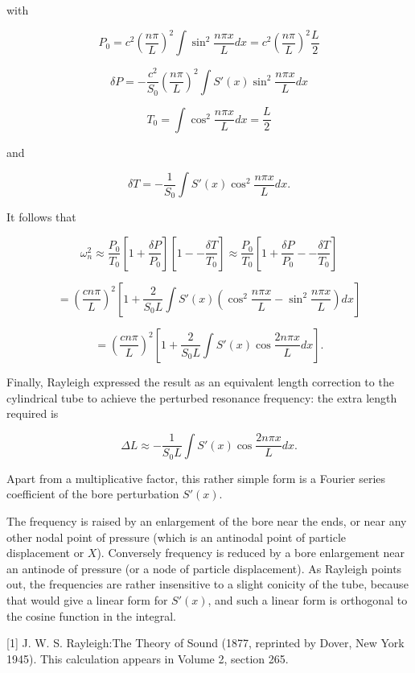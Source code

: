   with 

  $$P_0=c^2 \left(\dfrac{n \pi}{L}\right)^2 \int{ \sin^2 \dfrac{n \pi x}{L} 
  dx}=c^2 \left(\dfrac{n \pi}{L}\right)^2 \dfrac{L}{2} \tag{14}$$ 

  $$\delta P=-\dfrac{c^2}{S_0} \left(\dfrac{n \pi}{L}\right)^2 \int{S'(x) 
  \sin^2 \dfrac{n \pi x}{L} dx} \tag{15}$$ 

  $$T_0=\int{ \cos^2 \dfrac{n \pi x}{L} dx} =\dfrac{L}{2} \tag{16}$$ 

  and 

  $$\delta T=-\dfrac{1}{S_0} \int{S'(x) \cos^2 \dfrac{n \pi x}{L} dx} . 
  \tag{17}$$ 

  It follows that 

  $$\omega_n^2 \approx \dfrac{P_0}{T_0}\left[1 + \dfrac{\delta P}{P_0}\right] 
  \left[1 -- \dfrac{\delta T}{T_0}\right]\approx \dfrac{P_0}{T_0}\left[1 + 
  \dfrac{\delta P}{P_0} -- \dfrac{\delta T}{T_0}\right]$$ 

  $$=\left(\dfrac{c n \pi}{L}\right)^2 \left[1+\dfrac{2}{S_0L} \int{S'(x) 
  \left(\cos^2\dfrac{n \pi x}{L}-\sin^2 \dfrac{n \pi x}{L} \right) dx}\right]$$ 

  $$=\left(\dfrac{c n \pi}{L}\right)^2 \left[1+\dfrac{2}{S_0L} \int{S'(x) 
  \cos\dfrac{2n \pi x}{L} dx}\right] . \tag{18}$$ 

  Finally, Rayleigh expressed the result as an equivalent length correction to 
  the cylindrical tube to achieve the perturbed resonance frequency: the extra 
  length required is 

  $$\Delta L \approx -\dfrac{1}{S_0L} \int{S'(x) \cos\dfrac{2n \pi x}{L} dx} . 
  \tag{19}$$ 

  Apart from a multiplicative factor, this rather simple form is a Fourier 
  series coefficient of the bore perturbation $S'(x)$. 

  The frequency is raised by an enlargement of the bore near the ends, or near 
  any other nodal point of pressure (which is an antinodal point of particle 
  displacement or $X$). Conversely frequency is reduced by a bore enlargement 
  near an antinode of pressure (or a node of particle displacement). As 
  Rayleigh points out, the frequencies are rather insensitive to a slight 
  conicity of the tube, because that would give a linear form for $S'(x)$, and 
  such a linear form is orthogonal to the cosine function in the integral. 

  \sectionreferences{}[1] J. W. S. Rayleigh:The Theory of Sound (1877, 
  reprinted by Dover, New York 1945). This calculation appears in Volume 2, 
  section 265. 